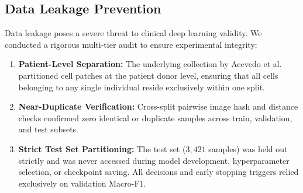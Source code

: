 \documentclass[conference]{IEEEtran}
\begin{document}
\begin{table}[htbp]
\caption{BloodMNIST Official Split Distribution}
\label{tab:distribution}
\centering
{}
\end{table}

\subsection{Data Leakage Prevention}
Data leakage poses a severe threat to clinical deep learning validity. We conducted a rigorous multi-tier audit to ensure experimental integrity:
\begin{enumerate}
    \item \textbf{Patient-Level Separation:} The underlying collection by Acevedo et al. \cite{acevedo2020dataset} partitioned cell patches at the patient donor level, ensuring that all cells belonging to any single individual reside exclusively within one split.
    \item \textbf{Near-Duplicate Verification:} Cross-split pairwise image hash and distance checks confirmed zero identical or duplicate samples across train, validation, and test subsets.
    \item \textbf{Strict Test Set Partitioning:} The test set ($3,421$ samples) was held out strictly and was never accessed during model development, hyperparameter selection, or checkpoint saving. All decisions and early stopping triggers relied exclusively on validation Macro-F1.
\end{enumerate}
\end{document}
